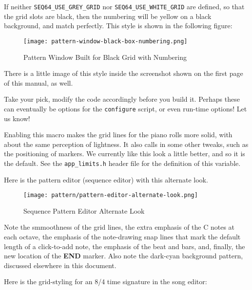         If neither \texttt{SEQ64\_USE\_GREY\_GRID} nor
        \texttt{SEQ64\_USE\_WHITE\_GRID} are defined, so that the grid slots
        are black, then the numbering will be yellow on a black background, and
        match perfectly.  This style is shown in the following figure:

\begin{figure}[H]
   \centering 
   \texttt{[image: pattern-window-black-box-numbering.png]}
   \caption{Pattern Window Built for Black Grid with Numbering}
   \label{fig:seq64_build_black_box_numbering}
\end{figure}

      There is a little image of this style inside the screenshot shown on
      the first page of this manual, as well.

      Take your pick, modify the code accordingly before you build it.
      Perhaps these can eventually be options for the \texttt{configure}
      script, or even run-time options!  Let us know!

        Enabling this macro makes the grid lines for the piano rolls
        more solid, with about the same perception of lightness.
        It also calls in some other tweaks, such as the positioning of
        markers.  We currently like this look a little better, and so it is
        the default.  See the \texttt{app\_limits.h}
        header file for the definition of this variable.

        Here is the pattern editor (sequence editor) with this alternate look.

\begin{figure}[H]
   \centering 
   \texttt{[image: pattern/pattern-editor-alternate-look.png]}
   \caption{Sequence Pattern Editor Alternate Look}
   \label{fig:seq64_pattern_editor_alternate_look}
\end{figure}

        Note the smmoothness of the grid lines, the extra emphasis of the C
        notes at each octave, the emphasis of the note-drawing snap lines that
        mark the default length of a click-to-add note, the emphasis of the
        beat and bars, and, finally, the new location of the
        \textbf{END} marker.  Also note the dark-cyan background pattern,
        discussed elsewhere in this document.

        Here is the grid-styling for an 8/4 time signature in the song editor:

